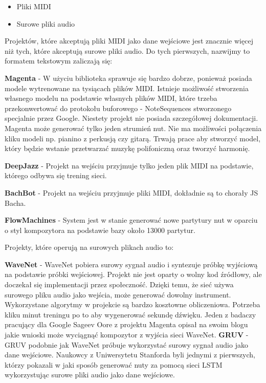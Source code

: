 	\begin{itemize}
		\item Pliki MIDI
		\item Surowe pliki audio 
	\end{itemize}	
	
	Projektów, które akceptują pliki MIDI jako dane wejściowe jest znacznie więcej niż tych, które akceptują surowe pliki audio. Do tych pierwszych, nazwijmy to formatem tekstowym zaliczają się:
	
		 \textbf{Magenta} - W użyciu biblioteka sprawuje się bardzo dobrze, ponieważ posiada modele wytrenowane na tysiącach plików MIDI. Istnieje możliwość stworzenia własnego modelu na podstawie własnych plików MIDI, które trzeba przekonwertować do protokołu buforowego - NoteSequences stworzonego specjalnie przez Google. Niestety projekt nie posiada szczegółowej dokumentacji. Magenta może generować tylko jeden strumień nut. Nie ma możliwości połączenia kliku modeli np. pianino z perkusją czy gitarą. Trwają prace aby stworzyć model, który będzie wstanie przetwarzać muzykę polifoniczną oraz tworzyć harmonię.
		 
		 \textbf{DeepJazz} - Projekt na wejściu przyjmuje tylko jeden plik MIDI na podstawie, którego odbywa się trening sieci.
		 
		 \textbf{BachBot} - Projekt na wejściu przyjmuje pliki MIDI, dokładnie są to chorały JS Bacha.  
		 
		 \textbf{FlowMachines} - System jest w stanie generować nowe partytury nut w oparciu o styl kompozytora na podstawie bazy około 13000 partytur. 
		 
		 
    	Projekty, które operują na surowych plikach audio to:
	
	
		\textbf{WaveNet} - WaveNet pobiera surowy sygnał audio i syntezuje próbkę wyjściową na podstawie próbki wejściowej. Projekt nie jest oparty o wolny kod źródłowy, ale doczekał się implementacji przez społeczność. Dzięki temu, że sieć używa surowego pliku audio jako wejścia, może generować dowolny instrument.  Wykorzystane algorytmy w projekcie są bardzo kosztowne obliczeniowa. Potrzeba kliku minut treningu po to aby wygenerować sekundę dźwięku. Jeden z badaczy pracujący dla Google Sageev Oore z projektu Magenta opisał na swoim blogu jakie wnioski może wyciągnąć kompozytor z wyjścia sieci WaveNet.
		\textbf{GRUV} -  GRUV podobnie jak WaveNet próbuje wykorzystać surowy sygnał audio jako dane wejściowe. Naukowcy z Uniwersytetu Stanforda byli jednymi z pierwszych, którzy pokazali w jaki sposób generować nuty za pomocą sieci LSTM wykorzystując surowe pliki audio jako dane wejściowe.
		 
